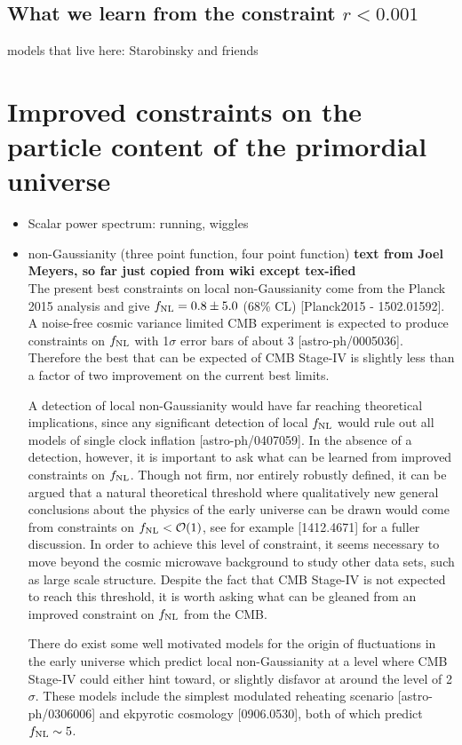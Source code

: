 \subsection{What we learn from the constraint $r<0.001$}

models that live here: Starobinsky and friends


\section{Improved constraints on the particle content of the primordial universe}
\begin{itemize}
\item Scalar power spectrum: running, wiggles
\item non-Gaussianity (three point function, four point function)
{\bf text from Joel Meyers, so far just copied from wiki except tex-ified} \\
The present best constraints on local non-Gaussianity come from the Planck 2015 analysis and give $f_{\rm NL} = 0.8 \pm 5.0$ (68\% CL) [Planck2015 - 1502.01592]. A noise-free cosmic variance limited CMB experiment is expected to produce constraints on $f_{\rm NL}$ with 1$\sigma$ error bars of about 3 [astro-ph/0005036]. Therefore the best that can be expected of CMB Stage-IV is slightly less than a factor of two improvement on the current best limits.

A detection of local non-Gaussianity would have far reaching theoretical implications, since any significant detection of local $f_{\rm NL}$ would rule out all models of single clock inflation [astro-ph/0407059]. In the absence of a detection, however, it is important to ask what can be learned from improved constraints on $f_{\rm NL}$. Though not firm, nor entirely robustly defined, it can be argued that a natural theoretical threshold where qualitatively new general conclusions about the physics of the early universe can be drawn would come from constraints on $f_{\rm NL}<\mathcal{O}(1)$, see for example [1412.4671] for a fuller discussion. In order to achieve this level of constraint, it seems necessary to move beyond the cosmic microwave background to study other data sets, such as large scale structure. Despite the fact that CMB Stage-IV is not expected to reach this threshold, it is worth asking what can be gleaned from an improved constraint on $f_{\rm NL}$ from the CMB.

There do exist some well motivated models for the origin of fluctuations in the early universe which predict local non-Gaussianity at a level where CMB Stage-IV could either hint toward, or slightly disfavor at around the level of 2$\sigma$. These models include the simplest modulated reheating scenario [astro-ph/0306006] and ekpyrotic cosmology [0906.0530], both of which predict $f_{\rm NL}\sim5$.


\end{itemize}
